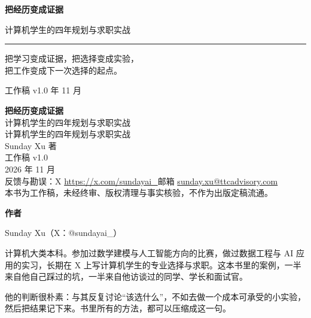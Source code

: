 \documentclass[UTF8,zihao=5,openany]{ctexbook}
\begin{document}
\begin{titlepage}
\thispagestyle{empty}
\centering
\vspace*{0.6cm}
\noindent{\color{teal!70}\rule{\textwidth}{0.5pt}}\par
\vspace{2.6cm}
{\fontsize{34pt}{44pt}\selectfont\bfseries\color{ink} 把经历变成证据\par}
\vspace{0.9cm}
{\large\color{teal} 计算机学生的四年规划与求职实战\par}
\vspace{1.2cm}
{\color{teal!55}\rule{5.5cm}{2pt}}\par
\vspace{2.4cm}
\begin{tcolorbox}[colback=mint,colframe=teal,width=0.88\textwidth,boxrule=0.8pt,arc=3mm]
\centering\normalsize
把学习变成证据，把选择变成实验，\\[2pt]
把工作变成下一次选择的起点。
\end{tcolorbox}
\vfill
{\small\color{ink} 工作稿 v1.0 年 11 月\par}
\vspace{0.5cm}
\noindent{\color{teal!70}\rule{\textwidth}{0.5pt}}
\end{titlepage}
\thispagestyle{empty}
\vspace*{3cm}
\begin{center}
{\large\bfseries 把经历变成证据}\\[0.2cm]
{\normalsize 计算机学生的四年规划与求职实战}\\[0.4cm]
{\normalsize 计算机学生的四年规划与求职实战}\\[1.6cm]
{\normalsize Sunday Xu 著}\\[0.2cm]
{\normalsize 工作稿 v1.0}\\[0.3cm]
{\normalsize 2026 年 11 月}\\[2.2cm]
{\small 反馈与勘误：X \url{https://x.com/sundayai_}\quad 邮箱 \url{sunday.xu@ttcadvisory.com}}\\[1.2cm]
{\footnotesize 本书为工作稿，未经终审、版权清理与事实核验，不作为出版定稿流通。}
\end{center}
\clearpage
\frontmatter
\thispagestyle{empty}
\vspace*{1.2cm}
\noindent\noindent{\color{teal!70}\rule{\textwidth}{0.5pt}}\par
\vspace{1.4cm}
{\Large\bfseries\color{ink} 作者}\par
\vspace{0.8cm}
{\large Sunday Xu（X：@sundayai\_）}\par
\vspace{1.2cm}
\begin{minipage}{0.86\textwidth}
\small
计算机大类本科。参加过数学建模与人工智能方向的比赛，做过数据工程与 AI 应用的实习，长期在 X 上写计算机学生的专业选择与求职。这本书里的案例，一半来自他自己踩过的坑，一半来自他访谈过的同学、学长和面试官。

\medskip
他的判断很朴素：与其反复讨论“该选什么”，不如去做一个成本可承受的小实验，然后把结果记下来。书里所有的方法，都可以压缩成这一句。
\end{minipage}
\vfill
\noindent{\color{teal!70}\rule{\textwidth}{0.5pt}}
\clearpage
\end{document}

